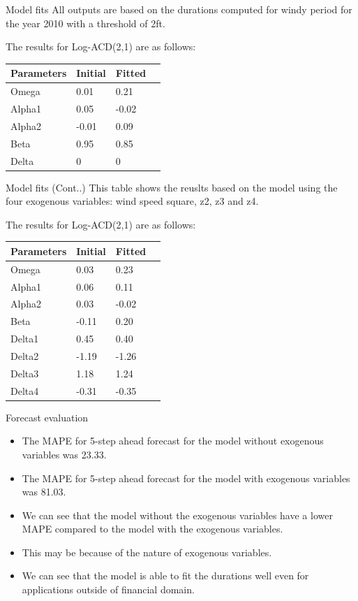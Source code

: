 \documentclass[
  ignorenonframetext,
]{beamer}
\begin{document}
\begin{frame}{Model fits}
\protect\hypertarget{model-fits}{}
All outputs are based on the durations computed for windy period for the
year 2010 with a threshold of 2ft.

The results for Log-ACD(2,1) are as follows:

\begin{tabular}{ |p{2cm}|p{2cm}|p{2cm}|p{2cm}|  }
 \hline
 Parameters & Initial & Fitted \\
 \hline
 Omega   & 0.01 & 0.21 \\
  \hline
 Alpha1    & 0.05 & -0.02 \\
  \hline
 Alpha2   & -0.01 & 0.09 \\
  \hline
 Beta    & 0.95 & 0.85 \\
  \hline
 Delta   & 0  & 0 \\
  \hline
\end{tabular}
\end{frame}

\begin{frame}{Model fits (Cont..)}
\protect\hypertarget{model-fits-cont..}{}
This table shows the reuslts based on the model using the four exogenous
variables: wind speed square, z2, z3 and z4.

The results for Log-ACD(2,1) are as follows:

\begin{tabular}{ |p{2cm}|p{2cm}|p{2cm}|p{2cm}|  }
 \hline
 Parameters& Initial & Fitted  \\
 \hline
 Omega   & 0.03 & 0.23 \\
  \hline
 Alpha1   & 0.06 & 0.11 \\
  \hline
 Alpha2   & 0.03 & -0.02 \\
  \hline
 Beta   & -0.11 & 0.20 \\
  \hline
 Delta1   & 0.45 & 0.40  \\
  \hline
 Delta2   & -1.19 & -1.26  \\
  \hline
 Delta3   & 1.18 & 1.24  \\
  \hline
 Delta4   & -0.31 & -0.35  \\
  \hline
\end{tabular}
\end{frame}

\begin{frame}{Forecast evaluation}
\protect\hypertarget{forecast-evaluation}{}
\begin{itemize}
\item
  The MAPE for 5-step ahead forecast for the model without exogenous
  variables was 23.33.
\item
  The MAPE for 5-step ahead forecast for the model with exogenous
  variables was 81.03.
\item
  We can see that the model without the exogenous variables have a lower
  MAPE compared to the model with the exogenous variables.
\item
  This may be because of the nature of exogenous variables.
\item
  We can see that the model is able to fit the durations well even for
  applications outside of financial domain.
\end{itemize}
\end{frame}
\end{document}
